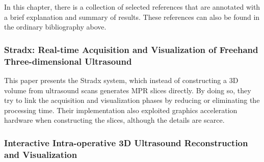 In this chapter, there is a collection of selected references that are annotated with a brief explanation and summary of results. These references can also be found in the ordinary bibliography above.

	
	
		
	\subsubsection{Stradx: Real-time Acquisition and Visualization of Freehand Three-dimensional Ultrasound \cite{prager1998}}
	
		This paper presents the Stradx system, which instead of constructing a 3D volume from ultrasound scans generates MPR slices directly. By doing so, they try to link the acquisition and visualization phases by reducing or eliminating the processing time. Their implementation also exploited graphics acceleration hardware when constructing the slices, although the details are scarce.
		
	
	
	\subsubsection{Interactive Intra-operative 3D Ultrasound Reconstruction and Visualization \cite{gobbi2002}}
	
